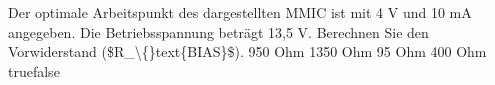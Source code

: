     {Der optimale Arbeitspunkt des dargestellten MMIC ist mit 4 V und 10 mA angegeben. Die Betriebsspannung beträgt 13,5 V. Berechnen Sie den Vorwiderstand (\$R\_\textbackslash\{\}text\{BIAS\}\$).}
    {950 Ohm}
    {1350 Ohm}
    {95 Ohm}
    {400 Ohm}
    {true}{false}